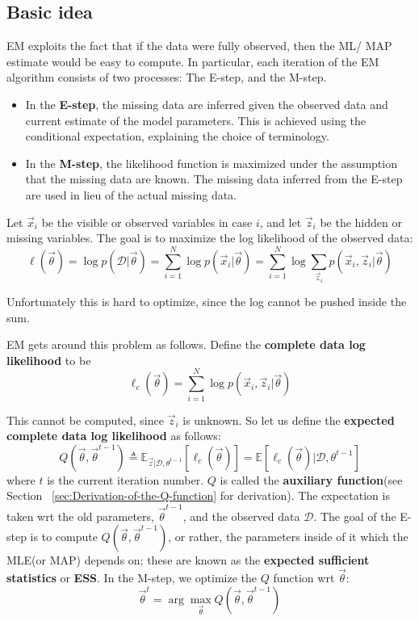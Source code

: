 \subsection{Basic idea}
EM exploits the fact that if the data were fully observed, then the ML/ MAP estimate would be easy to compute. In particular, each iteration of the EM algorithm consists of two processes: The E-step, and the M-step. 
\begin{itemize}
\item{In the \textbf{E-step}, the missing data are inferred given the observed data and current estimate of the model parameters. This is achieved using the conditional expectation, explaining the choice of terminology.}
\item{In the \textbf{M-step}, the likelihood function is maximized under the assumption that the missing data are known. The missing data inferred from the E-step are used in lieu of the actual missing data.}
\end{itemize}

Let $\vec{x}_i$ be the visible or observed variables in case $i$, and let $\vec{z}_i$ be the hidden or missing variables. The goal is to maximize the log likelihood of the observed data:
\begin{equation}
\ell(\vec{\theta})=\log p(\mathcal{D}|\vec{\theta})=\sum\limits_{i=1}^N \log p(\vec{x}_i|\vec{\theta})=\sum\limits_{i=1}^N \log{\sum\limits_{\vec{z}_i} p(\vec{x}_i,\vec{z}_i|\vec{\theta})}
\end{equation}

Unfortunately this is hard to optimize, since the log cannot be pushed inside the sum.

EM gets around this problem as follows. Define the \textbf{complete data log likelihood} to be
\begin{equation}
\ell_c(\vec{\theta})=\sum\limits_{i=1}^N \log p(\vec{x}_i,\vec{z}_i|\vec{\theta})
\end{equation}

This cannot be computed, since $\vec{z}_i$ is unknown. So let us define the \textbf{expected complete data log likelihood} as follows:
\begin{equation}\label{eqn:auxiliary-function}
Q(\vec{\theta},\vec{\theta}^{t-1}) \triangleq \mathbb{E}_{\vec{z}|\mathcal{D},\theta^{t-1}}\left[\ell_c(\vec{\theta})\right]=\mathbb{E}\left[\ell_c(\vec{\theta})| \mathcal{D},\theta^{t-1}\right]
\end{equation}
where $t$ is the current iteration number. $Q$ is called the \textbf{auxiliary function}(see Section ~\ref{sec:Derivation-of-the-Q-function} for derivation). The expectation is taken wrt the old parameters, $\vec{\theta}^{t-1}$, and the observed data $\mathcal{D}$. The goal of the E-step is to compute $Q(\vec{\theta},\vec{\theta}^{t-1})$, or rather, the parameters inside of it which the MLE(or MAP) depends on; these are known as the \textbf{expected sufficient statistics} or \textbf{ESS}. In the M-step, we optimize the $Q$ function wrt $\vec{\theta}$:
\begin{equation}
\vec{\theta}^t=\arg\max_{\vec{\theta}} Q(\vec{\theta},\vec{\theta}^{t-1})
\end{equation}

